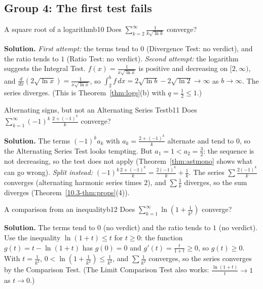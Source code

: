 \documentclass[11pt]{article}
\begin{document}
\subsection*{Group 4: The first test fails}

\begin{exmp}{A square root of a logarithm}{b10}
Does $\displaystyle\sum_{k=2}^\infty\frac1{k\sqrt{\ln k}}$ converge?

\textbf{Solution.} \emph{First attempt:} the terms tend to $0$ (Divergence Test: no verdict), and the ratio tends to $1$ (Ratio Test: no verdict). \emph{Second attempt:} the logarithm suggests the Integral Test. $f(x)=\frac1{x\sqrt{\ln x}}$ is positive and decreasing on $[2,\infty)$, and $\frac d{dx}\left(2\sqrt{\ln x}\right)=\frac1{x\sqrt{\ln x}}$, so $\int_2^bf\,dx=2\sqrt{\ln b}-2\sqrt{\ln2}\to\infty$ as $b\to\infty$. The series diverges. (This is Theorem~\ref{thm:logs}(b) with $q=\frac12\le1$.)
\end{exmp}

\begin{exmp}{Alternating signs, but not an Alternating Series Test}{b11}
Does $\displaystyle\sum_{k=1}^\infty(-1)^k\,\frac{2+(-1)^k}{k}$ converge?

\textbf{Solution.} The terms $(-1)^ka_k$ with $a_k=\frac{2+(-1)^k}k$ alternate and tend to $0$, so the Alternating Series Test looks tempting. But $a_1=1<a_2=\frac32$: the sequence is not decreasing, so the test does not apply (Theorem~\ref{thm:astmono} shows what can go wrong). \emph{Split instead:} $(-1)^k\frac{2+(-1)^k}k=\frac{2(-1)^k}k+\frac1k$. The series $\sum\frac{2(-1)^k}k$ converges (alternating harmonic series times $2$), and $\sum\frac1k$ diverges, so the sum diverges (Theorem~\ref{10.3-thm:props}(4)).
\end{exmp}

\begin{exmp}{A comparison from an inequality}{b12}
Does $\displaystyle\sum_{k=1}^\infty\ln\left(1+\frac1{k^2}\right)$ converge?

\textbf{Solution.} The terms tend to $0$ (no verdict) and the ratio tends to $1$ (no verdict). Use the inequality $\ln(1+t)\le t$ for $t\ge0$: the function $g(t)=t-\ln(1+t)$ has $g(0)=0$ and $g'(t)=\frac t{1+t}\ge0$, so $g(t)\ge0$. With $t=\frac1{k^2}$, $0<\ln\left(1+\frac1{k^2}\right)\le\frac1{k^2}$, and $\sum\frac1{k^2}$ converges, so the series converges by the Comparison Test. (The Limit Comparison Test also works: $\frac{\ln(1+t)}t\to1$ as $t\to0$.)
\end{exmp}
\end{document}
